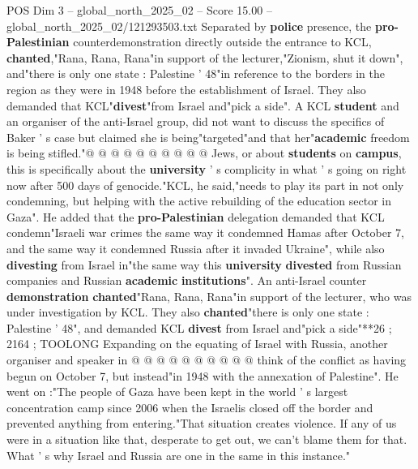 \begin{textsample}{POS Dim 3 – global\_north\_2025\_02 – Score 15.00 – global\_north\_2025\_02/121293503.txt}
Separated by \textbf{police} presence, the \textbf{pro-Palestinian} counterdemonstration directly outside the entrance to KCL, \textbf{chanted},"Rana, Rana, Rana"in support of the lecturer,"Zionism, shut it down", and"there is only one state : Palestine ' 48"in reference to the borders in the region as they were in 1948 before the establishment of Israel.
They also demanded that KCL"\textbf{divest}"from Israel and"pick a side".
A KCL \textbf{student} and an organiser of the anti-Israel group, did not want to discuss the specifics of Baker ' s case but claimed she is being"targeted"and that her"\textbf{academic} freedom is being stifled."@ @ @ @ @ @ @ @ @ @ Jews, or about \textbf{students} on \textbf{campus}, this is specifically about the \textbf{university} ' s complicity in what ' s going on right now after 500 days of genocide."KCL, he said,"needs to play its part in not only condemning, but helping with the active rebuilding of the education sector in Gaza".
He added that the \textbf{pro-Palestinian} delegation demanded that KCL condemn"Israeli war crimes the same way it condemned Hamas after October 7, and the same way it condemned Russia after it invaded Ukraine", while also \textbf{divesting} from Israel in"the same way this \textbf{university} \textbf{divested} from Russian companies and Russian \textbf{academic} \textbf{institutions}".
An anti-Israel counter \textbf{demonstration} \textbf{chanted}"Rana, Rana, Rana"in support of the lecturer, who was under investigation by KCL.
They also \textbf{chanted}"there is only one state : Palestine ' 48", and demanded KCL \textbf{divest} from Israel and"pick a side"**26 ; 2164 ; TOOLONG Expanding on the equating of Israel with Russia, another organiser and speaker in @ @ @ @ @ @ @ @ @ @ think of the conflict as having begun on October 7, but instead"in 1948 with the annexation of Palestine".
He went on :"The people of Gaza have been kept in the world ' s largest concentration camp since 2006 when the Israelis closed off the border and prevented anything from entering."That situation creates violence.
If any of us were in a situation like that, desperate to get out, we can't blame them for that.
What ' s why Israel and Russia are one in the same in this instance."

\end{textsample}
